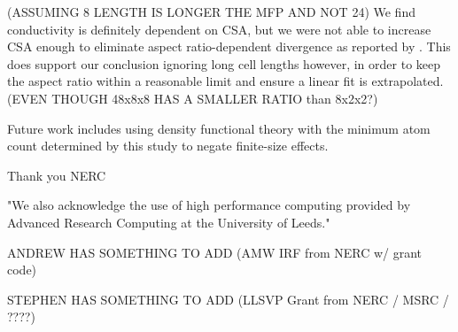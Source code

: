 \documentclass[%
preprint,                                  %
nofootinbib,
 amsmath,amssymb,
 aps,
]{revtex4-1}
\begin{document}
(ASSUMING 8 LENGTH IS LONGER THE MFP AND NOT 24) We find conductivity is definitely dependent on CSA, but we were not able to increase CSA enough to eliminate aspect ratio-dependent divergence as reported by \citet{Hu2011}. This does support our conclusion ignoring long cell lengths however, in order to keep the aspect ratio within a reasonable limit and ensure a linear fit is extrapolated. (EVEN THOUGH 48x8x8 HAS A SMALLER RATIO than 8x2x2?)

Future work includes using density functional theory with the minimum atom count determined by this study to negate finite-size effects.  

\begin{acknowledgements}
Thank you NERC

"We also acknowledge the use of high performance computing provided by Advanced Research Computing at the University of Leeds."

ANDREW HAS SOMETHING TO ADD (AMW IRF from NERC w/ grant code)

STEPHEN HAS SOMETHING TO ADD (LLSVP Grant from NERC / MSRC / ????)
\end{acknowledgements}


\end{document}
